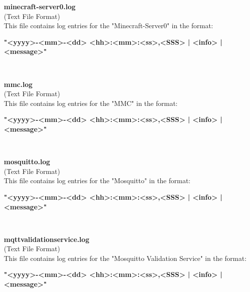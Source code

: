 \begin{description}
\begin{addmargin}[0em]{0em}
    \label{minecraft-server0.log}
    \begin{addmargin}[1em]{0em} %
        \textbf{minecraft-server0.log}\\
        (Text File Format)\\
        This file contains log entries for the "Minecraft-Server0" in the format:
        \begin{addmargin}[1em]{0em}
            \textbf{"<yyyy>-<mm>-<dd> <hh>:<mm>:<ss>,<SSS> | <info> | <message>"}
        \end{addmargin}
    \end{addmargin} %
    \textbf{\\}

    \label{mmc.log}
    \begin{addmargin}[1em]{0em} %
        \textbf{mmc.log}\\
        (Text File Format)\\
        This file contains log entries for the "MMC" in the format:
        \begin{addmargin}[1em]{0em}
            \textbf{"<yyyy>-<mm>-<dd> <hh>:<mm>:<ss>,<SSS> | <info> | <message>"}
        \end{addmargin}
    \end{addmargin} %
    \textbf{\\}

    \label{mosquitto.log}
    \begin{addmargin}[1em]{0em} %
        \textbf{mosquitto.log}\\
        (Text File Format)\\
        This file contains log entries for the "Mosquitto" in the format:
        \begin{addmargin}[1em]{0em}
            \textbf{"<yyyy>-<mm>-<dd> <hh>:<mm>:<ss>,<SSS> | <info> | <message>"}
        \end{addmargin}
    \end{addmargin} %
    \textbf{\\}

    \label{mqttvalidationservice.log}
    \begin{addmargin}[1em]{0em} %
        \textbf{mqttvalidationservice.log}\\
        (Text File Format)\\
        This file contains log entries for the "Mosquitto Validation Service" in the format:
        \begin{addmargin}[1em]{0em}
            \textbf{"<yyyy>-<mm>-<dd> <hh>:<mm>:<ss>,<SSS> | <info> | <message>"}
        \end{addmargin}
    \end{addmargin} %
    \textbf{\\}


\end{addmargin}
\end{description}
